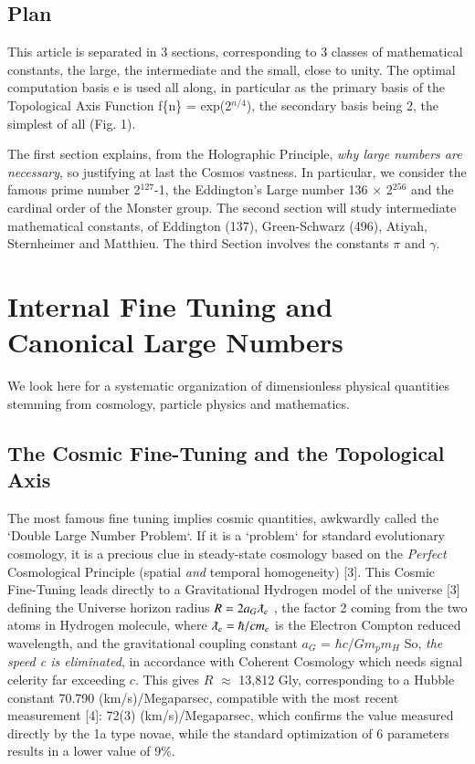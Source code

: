 \documentclass[twoside,draft]{article}
\begin{document}
\begin{sloppypar}
{\subsection{Plan}
This article is separated in 3 sections, corresponding to 3 classes of mathematical constants, the large, the intermediate and the small, close to unity. The optimal computation basis e is used all along, in particular as the primary basis of the Topological Axis Function f\{n\} = exp(2$^{n/4}$), the secondary basis being 2, the simplest of all (Fig. 1).

The first section explains, from the Holographic Principle, \textit{why large numbers are necessary}, so justifying at last the Cosmos vastness. In particular, we consider the famous prime number 2$^{127}\!$-1, the Eddington's Large number 136 $\times$ 2$^{256}\!$ and the cardinal order of the Monster group. The second section will study intermediate mathematical constants, of Eddington (137), Green-Schwarz (496), Atiyah, Sternheimer and Matthieu. The third Section involves the constants $\pi$ and $\gamma$. 

\section {Internal Fine Tuning and Canonical Large Numbers}
We look here for a systematic organization of dimensionless physical quantities stemming from cosmology, particle physics and mathematics.
\subsection {The Cosmic Fine-Tuning and the Topological Axis}

The most famous fine tuning implies cosmic quantities, awkwardly called the `Double
Large Number Problem`. If it is a `problem` for standard evolutionary cosmology, it is a precious
clue in steady-state cosmology based on the \textit{Perfect} Cosmological Principle (spatial \textit{and} temporal
homogeneity) [3].
This Cosmic Fine-Tuning leads directly to a Gravitational Hydrogen model of the universe [3]
defining the Universe horizon radius $R = 2a_{G} \lambdabar_{e}$ , the factor 2 coming from the two atoms in
Hydrogen molecule, where 
$\lambdabar_{e} = \hbar/cm_{e}$
is the Electron Compton reduced wavelength, and the
gravitational coupling constant 
$a_{G}$ = $\hbar$$c$/$G$$m_{p}$$m_{H}$
So, \textit{the speed c is eliminated}, in accordance with
Coherent Cosmology which needs signal celerity far exceeding $c$. This gives $R$ $\approx$ 13,812 Gly, corresponding to a Hubble constant 70.790 (km/s)/Megaparsec, compatible with the
most recent measurement [4]: 72(3) (km/s)/Megaparsec, which confirms the value measured
directly by the 1a type novae, while the standard optimization of 6 parameters results in a lower
value of 9\%.

}
\end{sloppypar}
\end{document}

